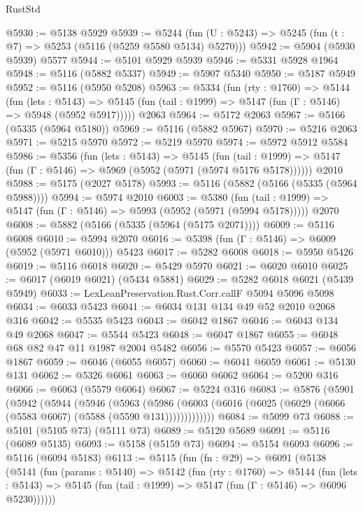 \begin{lexlean}{RustStd}
\begin{coremodule}
@5930 := @5138 @5929
@5939 := @5244 (fun (U : @5243) => @5245 (fun (t : @7) => @5253 (@5116 (@5259 @5580 @5134) @5270)))
@5942 := @5904 (@5930 @5939) @5577
@5944 := @5101 @5929 @5939
@5946 := @5331 @5928 @1964
@5948 := @5116 (@5882 @5337)
@5949 := @5907 @5340
@5950 := @5187 @5949
@5952 := @5116 (@5950 @5208)
@5963 := @5334
    (fun (rty : @1760) =>
    @5144
      (fun (lets : @5143) =>
      @5145 (fun (tail : @1999) => @5147 (fun (Γ : @5146) => @5948 (@5952 @5917)))))
    @2063
@5964 := @5172 @2063
@5967 := @5166 (@5335 (@5964 @5180))
@5969 := @5116 (@5882 @5967)
@5970 := @5216 @2063
@5971 := @5215 @5970
@5972 := @5219 @5970
@5974 := @5972 @5912 @5584
@5986 := @5356
    (fun (lets : @5143) =>
    @5145
      (fun (tail : @1999) => @5147 (fun (Γ : @5146) => @5969 (@5952 (@5971 (@5974 @5176 @5178))))))
    @2010
@5988 := @5175 (@2027 @5178)
@5993 := @5116 (@5882 (@5166 (@5335 (@5964 @5988))))
@5994 := @5974 @2010
@6003 := @5380
    (fun (tail : @1999) => @5147 (fun (Γ : @5146) => @5993 (@5952 (@5971 (@5994 @5178)))))
    @2070
@6008 := @5882 (@5166 (@5335 (@5964 (@5175 @2071))))
@6009 := @5116 @6008
@6010 := @5994 @2070
@6016 := @5398 (fun (Γ : @5146) => @6009 (@5952 (@5971 @6010))) @5423
@6017 := @5282 @6008
@6018 := @5950 @5426
@6019 := @5116 @6018
@6020 := @5429 @5970
@6021 := @6020 @6010
@6025 := @6017 (@6019 @6021) (@5434 @5881)
@6029 := @5282 @6018 @6021 (@5439 @5949)
@6033 := LexLeanPreservation.Rust.Corr.callF @5094 @5096 @5098
@6034 := @6033 @5423
@6041 := @6034 @131 @134 @49 @52 @2010 @2068 @316
@6042 := @5535 @5423
@6043 := @6042 @1867
@6046 := @6043 @134 @49 @2068
@6047 := @5544 @5423
@6048 := @6047 @1867
@6055 := @6048 @68 @82 @47 @11 @1987 @2004 @5482
@6056 := @5570 @5423
@6057 := @6056 @1867
@6059 := @6046 (@6055 @6057)
@6060 := @6041 @6059
@6061 := @5130 @131
@6062 := @5326 @6061
@6063 := @6060 @6062
@6064 := @5200 @316
@6066 := @6063 (@5579 @6064)
@6067 := @5224 @316
@6083 := @5876
    (@5901
      (@5942
        (@5944
          (@5946
            (@5963
              (@5986
                (@6003 (@6016 (@6025 (@6029 (@6066 (@5583 @6067) (@5588 (@5590 @131)))))))))))))
@6084 := @5099 @73
@6088 := @5101 (@5105 @73) (@5111 @73)
@6089 := @5120 @5689
@6091 := @5116 (@6089 @5135)
@6093 := @5158 (@5159 @73)
@6094 := @5154 @6093
@6096 := @5116 (@6094 @5183)
@6113 := @5115
    (fun (fn : @29) =>
    @6091
      (@5138
        (@5141
          (fun (params : @5140) =>
          @5142
            (fun (rty : @1760) =>
            @5144
              (fun (lets : @5143) =>
              @5145 (fun (tail : @1999) => @5147 (fun (Γ : @5146) => @6096 @5230))))))

\end{coremodule}
\end{lexlean}
